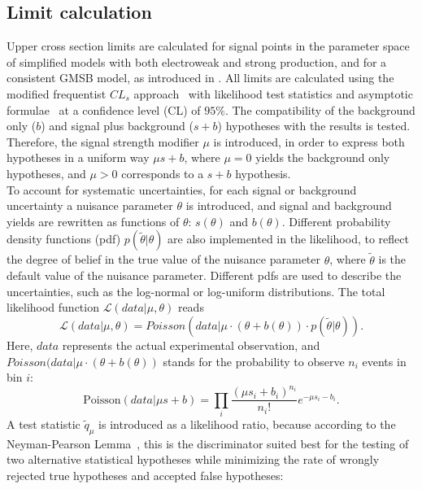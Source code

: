 \subsection{Limit calculation}
Upper cross section limits are calculated for signal points in the parameter space of simplified models with both electroweak and strong production, and for a consistent GMSB model, as introduced in . All limits are calculated using the modified frequentist $CL_s$ approach~\cite{CLS1,CLS2,CLS3} with likelihood test statistics and asymptotic formulae~\cite{AsymptoticFormulae,AsymptoticFormulae2} at a confidence level (CL) of $95\%$. The compatibility of the background only ($b$) and signal plus background ($s+b$) hypotheses with the results is tested. Therefore, the signal strength modifier $\mu$ is introduced, in order to express both hypotheses in a uniform way $\mu s+b$, where $\mu=0$ yields the background only hypotheses, and $\mu>0$ corresponds to a $s+b$ hypothesis.\\
To account for systematic uncertainties, for each signal or background uncertainty a nuisance parameter $\theta$ is introduced, and signal and background yields are rewritten as functions of $\theta$: $s(\theta)$ and $b(\theta)$. Different probability density functions (pdf) $p(\tilde{\theta}|\theta)$ are also implemented in the likelihood, to reflect the degree of belief in the true value of the nuisance parameter $\theta$, where $\tilde{\theta}$ is the default value of the nuisance parameter. Different pdfs are used to describe the uncertainties, such as the log-normal or log-uniform distributions. The total likelihood function $\mathcal{L}(data|\mu,\theta)$ reads
\begin{equation}
 \mathcal{L}(data|\mu,\theta)= Poisson(data|\mu\cdot(\theta+b(\theta))\cdot p(\tilde{\theta}|\theta)).
\end{equation}
Here, $data$ represents the actual experimental observation, and $Poisson(data|\mu\cdot(\theta+b(\theta))$ stands for the probability to observe $n_i$ events in bin $i$:
\begin{equation}
 \mathrm{Poisson}(data|\mu s+b)=\prod_i \frac{(\mu s_i+b_i)^{n_i}}{n_i!}e^{-\mu s_i - b_i}.
\end{equation}
A test statistic $\tilde{q}_\mu$ is introduced as a likelihood ratio, because according to the Neyman-Pearson Lemma~\cite{NeymanPearson}, this is the discriminator suited best for the testing of two alternative statistical hypotheses while minimizing the rate of wrongly rejected true hypotheses and accepted false hypotheses:
